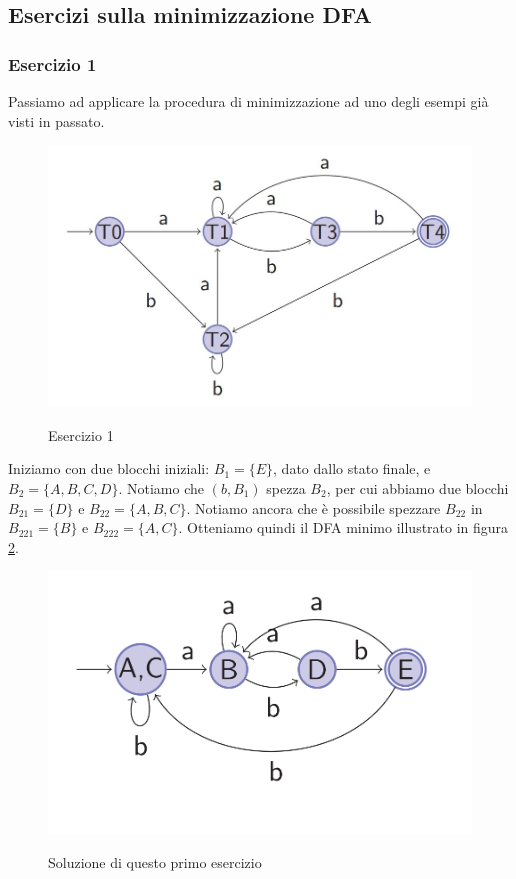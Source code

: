 \documentclass[class=book, crop=false, oneside, 12pt]{standalone}
\begin{document}
\subsection{Esercizi sulla minimizzazione DFA}
\subsubsection{Esercizio 1}
Passiamo ad applicare la procedura di minimizzazione ad uno degli esempi già visti in passato.

\begin{figure}[H]
	\centering
	\includegraphics[width=.8\textwidth,keepaspectratio]{s3_subset_construction.jpg}
	\label{mindfa-es-1}
	\caption{Esercizio 1}
\end{figure}

Iniziamo con due blocchi iniziali: \(B_{1}=\{E\}\), dato dallo stato finale, e \(B_{2}=\{A,B,C,D\}\). Notiamo che \((b,B_{1})\) spezza \(B_{2}\), per cui abbiamo due blocchi \(B_{21}=\{D\}\) e \(B_{22}=\{A,B,C\}\). Notiamo ancora che è possibile spezzare \(B_{22}\) in \(B_{221}=\{B\}\) e \(B_{222}=\{A,C\}\). Otteniamo quindi il DFA minimo illustrato in figura \ref{mindfa-es1-sol}. 

\begin{figure}[H]
	\centering
	\includegraphics[width=.8\textwidth,keepaspectratio]{dfa_grafo_1.png}
	\label{mindfa-es1-sol}
	\caption{Soluzione di questo primo esercizio}
\end{figure}
\end{document}
